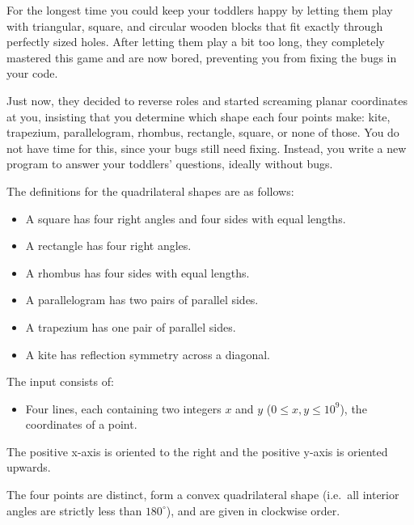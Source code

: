 

\newcommand{\maxx}{10^9}

For the longest time you could keep your toddlers happy by letting them play with
triangular, square, and circular wooden blocks that fit exactly through perfectly sized holes.
After letting them play a bit too long, they completely mastered this game and are
now bored, preventing you from fixing the bugs in your code.

Just now, they decided to reverse roles and started screaming planar coordinates at you,
insisting that you determine which shape each four points make:
kite, trapezium, parallelogram, rhombus, rectangle, square, or none of those.
You do not have time for this, since your bugs still need fixing.
Instead, you write a new program to answer your toddlers' questions, ideally without bugs.

The definitions for the quadrilateral shapes are as follows:
\vspace{-0.75em}
\begin{itemize}
    \setlength\itemsep{0pt}
    \item A square has four right angles and four sides with equal lengths.
    \item A rectangle has four right angles.
    \item A rhombus has four sides with equal lengths.
    \item A parallelogram has two pairs of parallel sides.
    \item A trapezium has one pair of parallel sides.
    \item A kite has reflection symmetry across a diagonal.
\end{itemize}

\begin{Input}
    The input consists of:
    \begin{itemize}
        \item Four lines, each containing two integers $x$ and $y$ ($0\leq x,y\leq \maxx$), the coordinates of a point.
    \end{itemize}
    The positive x-axis is oriented to the right and the positive y-axis is oriented upwards.

    The four points are distinct,
    form a convex quadrilateral shape (i.e.~all interior angles are strictly less than $180^\circ$),
    and are given in clockwise order.
\end{Input}

